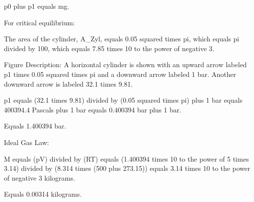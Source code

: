 p0 plus p1 equals mg.

For critical equilibrium:

The area of the cylinder, A_Zyl, equals 0.05 squared times pi, which equals pi divided by 100, which equals 7.85 times 10 to the power of negative 3.

Figure Description: A horizontal cylinder is shown with an upward arrow labeled p1 times 0.05 squared times pi and a downward arrow labeled 1 bar. Another downward arrow is labeled 32.1 times 9.81.

p1 equals (32.1 times 9.81) divided by (0.05 squared times pi) plus 1 bar equals 400394.4 Pascals plus 1 bar equals 0.400394 bar plus 1 bar.

Equals 1.400394 bar.

Ideal Gas Law:

M equals (pV) divided by (RT) equals (1.400394 times 10 to the power of 5 times 3.14) divided by (8.314 times (500 plus 273.15)) equals 3.14 times 10 to the power of negative 3 kilograms.

Equals 0.00314 kilograms.
